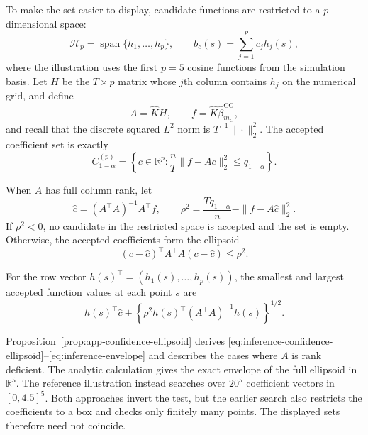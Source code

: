 To make the set easier to display, candidate functions are restricted to a
$p$-dimensional space:
\begin{equation}
    \mathcal H_p
    =\operatorname{span}\{h_1,\ldots,h_p\},
    \qquad
    b_c(s)=\sum_{j=1}^{p}c_jh_j(s),
    \label{eq:inference-truncated-space}
\end{equation}
where the illustration uses the first $p=5$ cosine functions from the
simulation basis.  Let $H$ be the $T\times p$ matrix whose $j$th column
contains $h_j$ on the numerical grid, and define
\begin{equation}
    A=\widehat K H,
    \qquad
    f=\widehat K\widehat\beta_{m_C}^{\mathrm{CG}},
    \label{eq:inference-confidence-matrices}
\end{equation}
and recall that the discrete squared $L^2$ norm is $T^{-1}\|\cdot\|_2^2$.
The accepted coefficient set is exactly
\begin{equation}
    C_{1-\alpha}^{(p)}
    =\left\{c\in\mathbb R^p:
       \frac nT\|f-Ac\|_2^2\leq q_{1-\alpha}
      \right\}.
    \label{eq:inference-coefficient-set}
\end{equation}

When $A$ has full column rank, let
\begin{equation}
    \widehat c=(A^\top A)^{-1}A^\top f,
    \qquad
    \rho^2=\frac{Tq_{1-\alpha}}n-
             \|f-A\widehat c\|_2^2.
    \label{eq:inference-ellipsoid-parameters}
\end{equation}
If $\rho^2<0$, no candidate in the restricted space is accepted and the set
is empty.  Otherwise, the accepted coefficients form the ellipsoid
\begin{equation}
    (c-\widehat c)^\top A^\top A(c-\widehat c)
    \leq\rho^2.
    \label{eq:inference-confidence-ellipsoid}
\end{equation}
\begin{samepage}
For the row vector $h(s)^\top=(h_1(s),\ldots,h_p(s))$, the smallest and largest
accepted function values at each point $s$ are
\begin{equation}
    h(s)^\top\widehat c
    \mathbin{\pm}
    \left\{
      \rho^2 h(s)^\top(A^\top A)^{-1}h(s)
    \right\}^{1/2}.
    \label{eq:inference-envelope}
\end{equation}
\end{samepage}
Proposition~\ref{prop:app-confidence-ellipsoid} derives
\eqref{eq:inference-confidence-ellipsoid}--\eqref{eq:inference-envelope} and
describes the cases where $A$ is rank deficient.  The analytic calculation
gives the exact envelope of the full ellipsoid in $\mathbb R^5$.  The
reference illustration instead searches over $20^5$ coefficient vectors in
$[0,4.5]^5$.  Both approaches invert the test, but the earlier search also
restricts the coefficients to a box and checks only finitely many points.
The displayed sets therefore need not coincide.

